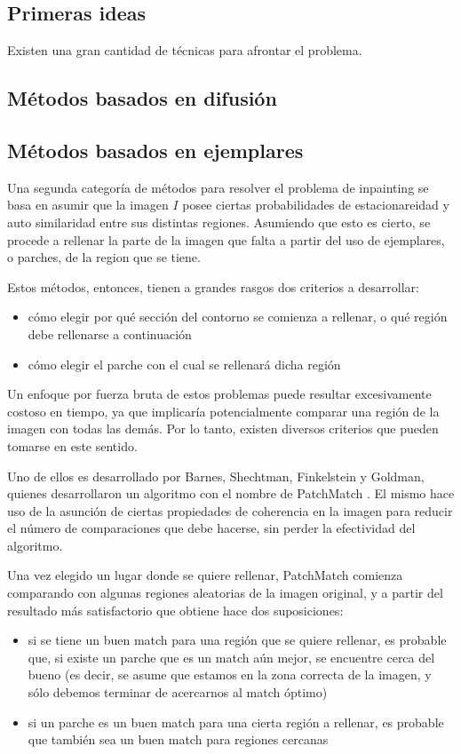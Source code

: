 \documentclass[assd_tpf_main.tex]{subfiles}
\begin{document}
\subsection{Primeras ideas}
Existen una gran cantidad de técnicas para afrontar el problema.


\subsection{Métodos basados en difusión}


\subsection{Métodos basados en ejemplares}
Una segunda categor\'ia de m\'etodos para resolver el problema de inpainting se basa en 
asumir que la imagen $I$ posee ciertas probabilidades de estacionareidad y auto similaridad 
entre sus distintas regiones. Asumiendo que esto es cierto, se procede a rellenar la parte
de la imagen que falta a partir del uso de ejemplares, o parches, de la region que se tiene.

Estos m\'etodos, entonces, tienen a grandes rasgos dos criterios a desarrollar:
\begin{itemize}
	\item c\'omo elegir por qu\'e secci\'on del contorno se comienza a rellenar, o qu\'e
	regi\'on debe rellenarse a continuaci\'on
	\item c\'omo elegir el parche con el cual se rellenar\'a dicha regi\'on
\end{itemize}

Un enfoque por fuerza bruta de estos problemas puede resultar excesivamente costoso en tiempo, ya que implicar\'ia potencialmente comparar una regi\'on de la imagen con todas las dem\'as. Por lo tanto, existen diversos criterios que pueden tomarse en este sentido.

Uno de ellos es desarrollado por Barnes, Shechtman, Finkelstein y Goldman, quienes desarrollaron un algoritmo con el nombre de PatchMatch \cite{patchmatch}.  El mismo
hace uso de la asunci\'on de ciertas propiedades de coherencia en la imagen para reducir
el n\'umero de comparaciones que debe hacerse, sin perder la efectividad del algoritmo.
 
Una vez elegido un lugar donde se quiere rellenar, PatchMatch comienza comparando con algunas regiones aleatorias de la imagen original, y a partir del resultado m\'as satisfactorio que obtiene hace dos suposiciones:
\begin{itemize}
	\item si se tiene un buen match para una regi\'on que se quiere rellenar, es probable 
	que, si existe un parche que es un match a\'un mejor, se encuentre cerca del bueno (es
	decir, se asume que estamos en la zona correcta de la imagen, y s\'olo debemos
	terminar de acercarnos al match \'optimo)
	\item si un parche es un buen match para una cierta regi\'on a rellenar, es probable que
	tambi\'en sea un buen match para regiones cercanas
\end{itemize}
\end{document}
